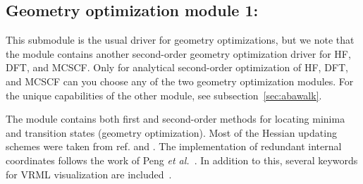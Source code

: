 \subsection{Geometry optimization module 1: }\label{subsec:minimize}

This submodule is the usual driver for geometry optimizations, but we
note that the  module contains another second-order
geometry optimization driver for HF, DFT, and MCSCF.
Only for analytical second-order optimization of HF, DFT, and MCSCF can you choose
any of the two geometry optimization modules.
For the unique capabilities of the other module, see subsection~\ref{sec:abawalk}.

The  module contains both first and second-order methods
for locating minima and transition states
(geometry optimization).
Most of the Hessian updating schemes were taken from
ref.\cite{thkrprt95} and \cite{Fletcher}.
The implementation of redundant internal coordinates
follows the work of Peng {\it et al.\/}~\cite{cppyahbsmjfjcc17}.
In addition to this, several keywords for VRML visualization are included~\cite{VRML}.

